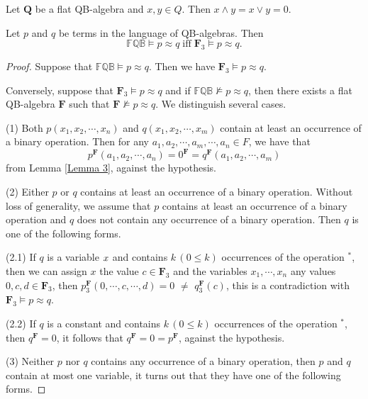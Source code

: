 \documentclass[10pt,a4paper]{amsart}
\begin{document}
\begin{lemma}\label{Lemma 3}\label{vee 0}
Let $\mathbf{Q}$ be a flat QB-algebra and $x,y\in Q$. Then $x\wedge y=x\vee y=0$.
\end{lemma}

\begin{theorem}\label{Proposition 4.1}
Let $p$ and $q$ be terms in the language of QB-algebras. Then
$$
\mathbb{FQB}\models p\approx q  \; \mathrm{iff}  \; \mathrm{\mathbf{F}_{3}}\models p\approx q.
$$
\end{theorem}

\begin{proof}
Suppose that $\mathbb{FQB}\models p\approx q$. Then we have $\mathrm{\mathbf{F}_{3}}\models p\approx q$.

Conversely, suppose that $\mathrm{\mathbf{F}_{3}}\models p\approx q$ and if $\mathbb{FQB}\nvDash p\approx q$, then there exists a flat QB-algebra $\mathbf{F}$ such that $\mathrm{\mathbf{F}}\nvDash p\approx q$. We distinguish several cases.

(1) Both $p(x_{1},x_{2},\cdots,x_{n})$ and $q(x_{1},x_{2},\cdots,x_{m})$ contain at least an occurrence of a binary operation. Then for any $a_{1},a_{2},\cdots,a_{m},\cdots,a_{n}\in F$, we have that
$$
p^\mathbf{F}(a_{1},a_{2},\cdots,a_{n})=0^\mathbf{F}=q^\mathbf{F}(a_{1},a_{2},\cdots,a_{m})
$$
from Lemma \ref{Lemma 3}, against the hypothesis.

(2) Either $p$ or $q$ contains at least an occurrence of a binary operation. Without loss of generality, we assume that $p$ contains at least an occurrence of a binary operation and $q$ does not contain any occurrence of a binary operation. Then $q$ is one of the following forms.

(2.1) If $q$ is a variable $\emph{x}$ and contains $k\,(0\leq k)$ occurrences of the operation $^{*}$, then we can assign $x$ the value $c\in \mathbf{F}_{3}$ and the variables $x_{1},\cdots ,x_{n}$ any values $0,c,d\in \mathbf{F}_{3}$, then $p^\mathbf{F}_{3}(0,\cdots,c,\cdots,d)=0$ $\neq $ $q^\mathbf{F}_{3}(c)$, this is a contradiction with $\mathrm{\mathbf{F}_{3}}\models p\approx q$.

(2.2) If $q$ is a constant and contains $k\,(0\leq k)$ occurrences of the operation $^{*}$, then $q^\mathbf{F}=0$, it follows that $q^\mathbf{F}=0=p^\mathbf{F}$, against the hypothesis.

(3) Neither $p$ nor $q$ contains any occurrence of a binary operation, then $p$ and $q$ contain at most one variable, it turns out that they have one of the following forms.


\end{proof}
\end{document}
